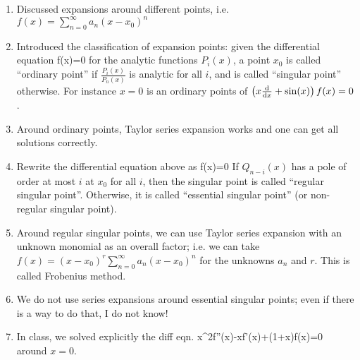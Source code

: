 {\begin{enumerate}
		\item Discussed expansions around different points, i.e. $f(x)=\sum\limits_{n=0}^\infty a_n(x-x_0)^n$
		
		\item Introduced the classification of expansion points: given the differential equation 
		\be 
		f(x)=0
		\ee 
		for the analytic functions $P_i(x)$, a point $x_0$ is called ``ordinary point'' if $\frac{P_i(x)}{P_n(x)}$ is analytic for all $i$, and is called ``singular point'' otherwise. For instance $x=0$ is an ordinary points of $\left(x\frac{\dd }{\dd x}+\sin(x)\right)f(x)=0$.
		\item Around ordinary points, Taylor series expansion works and one can get all solutions correctly.
		\item  Rewrite the differential equation above as 
		\be 
		f(x)=0
		\ee
		If $Q_{n-i}(x)$ has a pole of order at most $i$ at $x_0$ for all $i$, then the singular point is called ``regular singular point''. Otherwise, it is called ``essential singular point'' (or non-regular singular point).
		\item Around regular singular points, we can use Taylor series expansion with an unknown monomial as an overall factor; i.e. we can take $f(x)=(x-x_0)^r\sum\limits_{n=0}^\infty a_n (x-x_0)^n$ for the unknowns $a_n$ and $r$. This is called Frobenius method.
		\item We do not use series expansions around essential singular points; even if there is a way to do that, I do not know!
		\item In class, we solved explicitly the diff eqn.
		\be 
		x^2f''(x)-xf'(x)+(1+x)f(x)=0
		\ee 
		around $x=0$.
		

\end{enumerate}}
